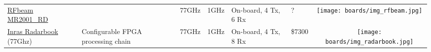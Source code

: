 \begin{longtable}[]{@{}llllllc@{}}
\begin{minipage}[t]{\colwidthA}\raggedright\strut
	\href{https://www.rfbeam.ch/files/products/26/downloads/ProductBrief_MR2001_RD.pdf}{RFbeam MR2001\_RD}
\strut\end{minipage} &
\begin{minipage}[t]{\colwidthB}\raggedright\strut

\strut\end{minipage} &
\begin{minipage}[t]{\colwidthC}\raggedright\strut
77GHz
\strut\end{minipage} &
\begin{minipage}[t]{\colwidthD}\raggedright\strut
1GHz
\strut\end{minipage} &
\begin{minipage}[t]{\colwidthE}\raggedright\strut
On-board, 4 Tx, 6 Rx
\strut\end{minipage} &
\begin{minipage}[t]{\colwidthF}\raggedright\strut
?
\strut\end{minipage} &
\begin{minipage}[t]{\colwidthG}\centering\strut
\texttt{[image: boards/img\_rfbeam.jpg]}
\strut\end{minipage}\tabularnewline

\begin{minipage}[t]{\colwidthA}\raggedright\strut
\href{http://www.inras.at/en/products/radarbook.html}{Inras Radarbook} (77Ghz)
\strut\end{minipage} &
\begin{minipage}[t]{\colwidthB}\raggedright\strut
Configurable FPGA processing chain
\strut\end{minipage} &
\begin{minipage}[t]{\colwidthC}\raggedright\strut
77GHz
\strut\end{minipage} &
\begin{minipage}[t]{\colwidthD}\raggedright\strut
1GHz
\strut\end{minipage} &
\begin{minipage}[t]{\colwidthE}\raggedright\strut
On-board, 4 Tx, 8 Rx
\strut\end{minipage} &
\begin{minipage}[t]{\colwidthF}\raggedright\strut
\$7300
\strut\end{minipage} &
\begin{minipage}[t]{\colwidthG}\centering\strut
\texttt{[image: boards/img\_radarbook.jpg]}
\strut\end{minipage}\tabularnewline


\end{longtable}
